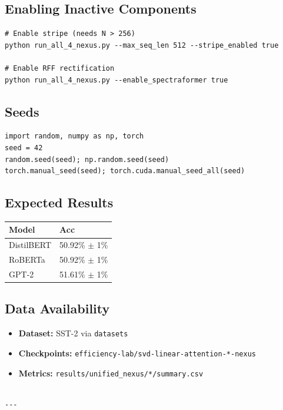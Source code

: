 \subsection{Enabling Inactive Components}

\begin{lstlisting}
# Enable stripe (needs N > 256)
python run_all_4_nexus.py --max_seq_len 512 --stripe_enabled true

# Enable RFF rectification
python run_all_4_nexus.py --enable_spectraformer true
\end{lstlisting}

\subsection{Seeds}

\begin{lstlisting}
import random, numpy as np, torch
seed = 42
random.seed(seed); np.random.seed(seed)
torch.manual_seed(seed); torch.cuda.manual_seed_all(seed)
\end{lstlisting}

\subsection{Expected Results}

\begin{table}[H]
\centering
\small
\begin{tabular}{ll}
\toprule
\textbf{Model} & \textbf{Acc} \\
\midrule
DistilBERT & 50.92\% $\pm$ 1\% \\
RoBERTa & 50.92\% $\pm$ 1\% \\
GPT-2 & 51.61\% $\pm$ 1\% \\
\bottomrule
\end{tabular}
\end{table}

\subsection{Data Availability}

\begin{itemize}
\item \textbf{Dataset:} SST-2 via \texttt{datasets}
\item \textbf{Checkpoints:} \texttt{efficiency-lab/svd-linear-attention-*-nexus}
\item \textbf{Metrics:} \texttt{results/unified\_nexus/*/summary.csv}
\end{itemize}
\begin{lstlisting}

---
\end{lstlisting}

